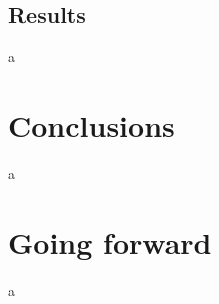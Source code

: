 \documentclass[12pt]{article}
\begin{document}
\subsection{Results}
a
\section{Conclusions}
a
\section{Going forward}
a


\end{document}
